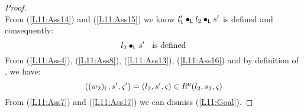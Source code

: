 \begin{lemma}[]
\begin{proof}
\begin{equation}
\end{equation}
%
From (\ref{L11:Ass14}) and (\ref{L11:Ass15}) we know $l'_1 \bullet_{\textsf{L}} l_2 \bullet_{\textsf{L}} s'$ is defined and consequently:
%
\begin{equation}
	l_2 \bullet_{\textsf{L}} s' \hspace*{0.2cm} \text{ is defined} \label{L11:Ass16}
\end{equation}
%
From (\ref{L11:Ass4}), (\ref{L11:Ass8}), (\ref{L11:Ass13}), (\ref{L11:Ass16}) and by definition of \updateR, we have:
%
\begin{equation}
	((w_2)_{\textsf{L}}, s', \varsigma_{}') = (l_2, s', \varsigma_{}) \in R^{\textsf{u}}(l_2, s_2, \varsigma_{})  \label{L11:Ass17}
\end{equation}
%
From (\ref{L11:Ass7}) and (\ref{L11:Ass17}) we can dismiss (\ref{L11:Goal}).
\end{proof}
%
\end{lemma}
%
%
